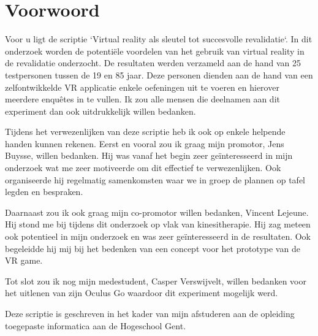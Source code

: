 
\chapter*{Voorwoord}
\label{ch:voorwoord}


Voor u ligt de scriptie `Virtual reality als sleutel tot succesvolle revalidatie`. In dit onderzoek worden de potentiële voordelen van het gebruik van virtual reality in de revalidatie onderzocht. De resultaten werden verzameld aan de hand van 25 testpersonen tussen de 19 en 85 jaar. Deze personen dienden aan de hand van een zelfontwikkelde VR applicatie enkele oefeningen uit te voeren en hierover meerdere enquêtes in te vullen. Ik zou alle mensen die deelnamen aan dit experiment dan ook uitdrukkelijk willen bedanken.

Tijdens het verwezenlijken van deze scriptie heb ik ook op enkele helpende handen kunnen rekenen. Eerst en vooral zou ik graag mijn promotor, Jens Buysse, willen bedanken. Hij was vanaf het begin zeer geïnteresseerd in mijn onderzoek wat me zeer motiveerde om dit effectief te verwezenlijken. Ook organiseerde hij regelmatig samenkomsten waar we in groep de plannen op tafel legden en bespraken.

Daarnaast zou ik ook graag mijn co-promotor willen bedanken, Vincent Lejeune. Hij stond me bij tijdens dit onderzoek op vlak van kinesitherapie. Hij zag meteen ook potentieel in mijn onderzoek en was zeer geïnteresseerd in de resultaten. Ook begeleidde hij mij bij het bedenken van een concept voor het prototype van de VR game.

Tot slot zou ik nog mijn medestudent, Casper Verswijvelt, willen bedanken voor het uitlenen van zijn Oculus Go waardoor dit experiment mogelijk werd.

 Deze scriptie is geschreven in het kader van mijn afstuderen aan de opleiding toegepaste informatica aan de Hogeschool Gent.